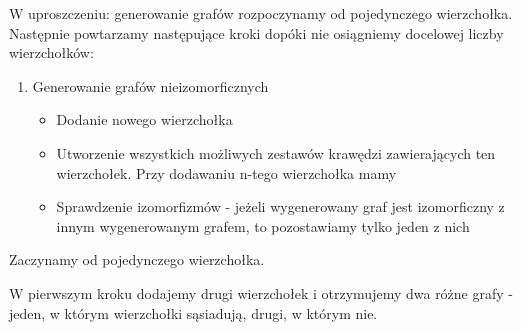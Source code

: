 \documentclass[11pt]{article}
\begin{document}
W uproszczeniu: generowanie grafów rozpoczynamy od pojedynczego wierzchołka.
Następnie powtarzamy następujące kroki dopóki nie osiągniemy docelowej liczby wierzchołków:
\begin{enumerate}
 \item Generowanie grafów nieizomorficznych 

 \begin{itemize}
 \item  Dodanie nowego wierzchołka  

 \item Utworzenie wszystkich możliwych zestawów krawędzi zawierających ten wierzchołek. Przy dodawaniu n-tego wierzchołka mamy 

 \item Sprawdzenie izomorfizmów - jeżeli wygenerowany graf jest izomorficzny z innym wygenerowanym grafem, to pozostawiamy tylko jeden z nich 
 
 \end{itemize}
\end{enumerate}

Zaczynamy od pojedynczego wierzchołka.

\begin{figure}[h]
  \centering
   \caption{}
\end{figure}

\begin{figure}[h]
  \centering
   \caption{}
\end{figure}

W pierwszym kroku dodajemy drugi wierzchołek i otrzymujemy dwa różne grafy - jeden, w którym wierzchołki sąsiadują, drugi, w którym nie. 
\end{document}
